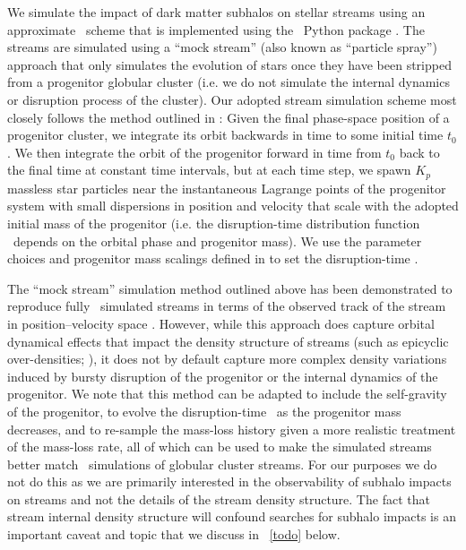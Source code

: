 We simulate the impact of dark matter subhalos on stellar streams using an approximate
\nbody\ scheme that is implemented using the \gala\ Python package \citep{gala}.
The streams are simulated using a ``mock stream'' (also known as ``particle spray'')
approach that only simulates the evolution of stars once they have been stripped from a
progenitor globular cluster (i.e. we do not simulate the internal dynamics or disruption
process of the cluster).
Our adopted stream simulation scheme most closely follows the method outlined in
\citet{Fardal:2015}: Given the final phase-space position of a progenitor cluster, we
integrate its orbit backwards in time to some initial time $t_0$.
We then integrate the orbit of the progenitor forward in time from $t_0$ back to the
final time at constant time intervals, but at each time step, we spawn $K_p$ massless
star particles near the instantaneous Lagrange points of the progenitor system with
small dispersions in position and velocity that scale with the adopted initial mass of
the progenitor (i.e. the disruption-time distribution function \df\ depends on the
orbital phase and progenitor mass).
We use the parameter choices and progenitor mass scalings defined in \citet{Fardal:2015}
to set the disruption-time \df.

The ``mock stream'' simulation method outlined above has been demonstrated to reproduce
fully \nbody\ simulated streams in terms of the observed track of the stream in
position--velocity space \citep[e.g.,][]{Kupper, Fardal, Gibbons}.
However, while this approach does capture orbital dynamical effects that impact the
density structure of streams (such as epicyclic over-densities; \citealt{Kupper}), it
does not by default capture more complex density variations induced by bursty disruption
of the progenitor or the internal dynamics of the progenitor.
We note that this method can be adapted to include the self-gravity of the progenitor,
to evolve the disruption-time \df\ as the progenitor mass decreases, and to re-sample
the mass-loss history given a more realistic treatment of the mass-loss rate, all of
which can be used to make the simulated streams better match \nbody\ simulations of
globular cluster streams.
For our purposes we do not do this as we are primarily interested in the observability
of subhalo impacts on streams and not the details of the stream density structure.
The fact that stream internal density structure will confound searches for subhalo
impacts is an important caveat and topic that we discuss in \sectionname~\ref{todo}
below.

